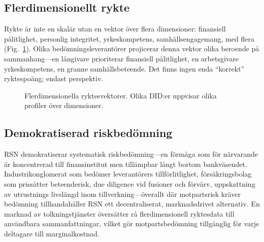 \documentclass[11pt,a4paper,twocolumn]{article}
\begin{document}
\subsection{Flerdimensionellt rykte}

Rykte är inte en skalär utan en vektor över flera dimensioner: finansiell pålitlighet, personlig integritet, yrkeskompetens, samhällsengagemang, med flera (Fig.~\ref{fig:reputation-radar}). Olika bedömningsleverantörer projicerar denna vektor olika beroende på sammanhang---en långivare prioriterar finansiell pålitlighet, en arbetsgivare yrkeskompetens, en granne samhällsbeteende. Det finns ingen enda ``korrekt'' ryktespoäng; endast perspektiv.

\begin{figure}[ht]
\centering
{}
\caption{Flerdimensionella ryktesvektorer. Olika DID:er uppvisar olika profiler över dimensioner.}
\label{fig:reputation-radar}
\end{figure}

\subsection{Demokratiserad riskbedömning}

RSN demokratiserar systematisk riskbedömning---en förmåga som för närvarande är koncentrerad till finansinstitut men tillämpbar långt bortom bankväsendet. Industrikonglomerat som bedömer leverantörers tillförlitlighet, försäkringsbolag som prissätter beteenderisk, due diligence vid fusioner och förvärv, uppskattning av utrustnings livslängd inom tillverkning---överallt där motpartsrisk kräver bedömning tillhandahåller RSN ett decentraliserat, marknadsdrivet alternativ. En marknad av tolkningstjänster översätter rå flerdimensionell ryktesdata till användbara sammanfattningar, vilket gör motpartsbedömning tillgänglig för varje deltagare till marginalkostnad.
\end{document}
